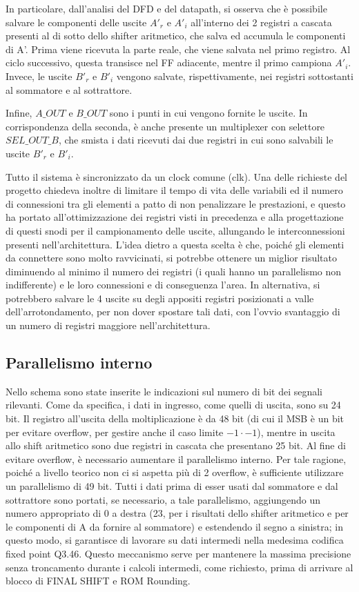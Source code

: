 \noindent In particolare, dall'analisi del DFD e del datapath, si osserva che è possibile salvare le componenti delle uscite $A'_r$ e $A'_i$ all'interno dei 2 registri a cascata presenti al di sotto dello shifter aritmetico, che salva ed accumula le componenti di A'. Prima viene ricevuta la parte reale, che viene salvata nel primo registro. Al ciclo successivo, questa transisce nel FF adiacente, mentre il primo campiona $A'_{i}$. Invece, le uscite $B'_r$ e $B'_i$ vengono salvate, rispettivamente, nei registri sottostanti al sommatore e al sottrattore.

\noindent Infine, $A\_OUT$ e $B\_OUT$ sono i punti in cui vengono fornite le uscite. In corrispondenza della seconda, è anche presente un multiplexer con selettore $SEL\_OUT\_B$, che smista i dati ricevuti dai due registri in cui sono salvabili le uscite $B'_r$ e $B'_i$.

\noindent Tutto il sistema è sincronizzato da un clock comune (clk).
Una delle richieste del progetto chiedeva inoltre di limitare il tempo di vita delle variabili ed il numero di connessioni tra gli elementi a patto di non penalizzare le prestazioni, e questo ha portato all’ottimizzazione dei registri visti in precedenza e alla progettazione di questi snodi per il campionamento delle uscite, allungando le interconnessioni presenti nell'architettura. L’idea dietro a questa scelta è che, poiché gli elementi da connettere sono molto ravvicinati, si potrebbe ottenere un miglior risultato diminuendo al minimo il numero dei registri (i quali hanno un parallelismo non indifferente) e le loro connessioni e di conseguenza l’area. In alternativa,  si potrebbero salvare le 4 uscite su degli appositi registri posizionati a valle dell'arrotondamento, per non dover spostare tali dati,  con l'ovvio svantaggio di un numero di registri maggiore nell'architettura.

\subsection{Parallelismo interno}

Nello schema sono state inserite le indicazioni sul numero di bit dei segnali rilevanti. Come da specifica, i dati in ingresso, come quelli di uscita, sono su 24 bit.
Il registro all’uscita della moltiplicazione è da 48 bit (di cui il MSB è un bit per evitare overflow, per gestire anche il caso limite $-1 \cdot -1$), mentre in uscita allo shift aritmetico sono due registri in cascata che presentano 25 bit. Al fine di evitare overflow, è necessario aumentare il parallelismo interno. Per tale ragione, poiché a livello teorico non ci si aspetta più di 2 overflow, è sufficiente utilizzare un parallelismo di 49 bit. Tutti i dati prima di esser usati dal sommatore e dal sottrattore sono portati, se necessario, a tale parallelismo, aggiungendo un numero appropriato di 0 a destra (23, per i risultati dello shifter aritmetico e per le componenti di A da fornire al sommatore) e estendendo il segno a sinistra; in questo modo, si garantisce di lavorare su dati intermedi nella medesima codifica fixed point Q3.46. Questo meccanismo serve per mantenere la massima precisione senza troncamento durante i calcoli intermedi, come richiesto, prima di arrivare al blocco di FINAL SHIFT e ROM Rounding.

